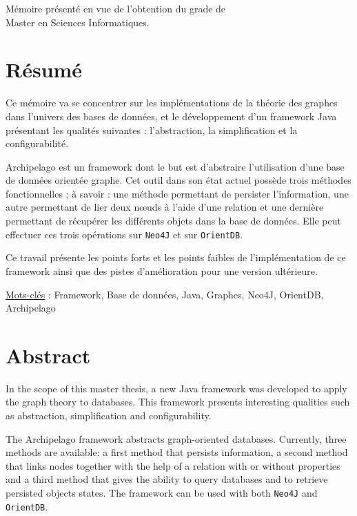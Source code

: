\documentclass[a4paper,fleqn,12pt,oneside]{book}
\begin{document}
\vspace{0.5cm}
\begin{center}
M\'emoire pr\'esent\'e en vue de l'obtention du grade de\\
Master en Sciences Informatiques.
\end{center}
\frontmatter
{}
\section*{Résumé}

Ce mémoire va se concentrer sur les implémentations de la théorie des graphes dans l'univers des bases de données, et le développement d'un framework Java présentant les qualités suivantes : l'abstraction, la simplification et la configurabilité. 

Archipelago est un framework dont le but est d'abstraire l'utilisation d'une base de données orientée graphe. Cet outil dans son  état actuel possède trois méthodes fonctionnelles ; à savoir : une méthode permettant de persister l'information, une autre permettant de lier deux nœuds à l'aide d'une relation et une dernière permettant de récupérer les différents objets dans la base de données. Elle peut effectuer ces trois opérations sur \texttt{Neo4J} et sur \texttt{OrientDB}.

Ce travail présente les points forts et les points faibles de l'implémentation de ce framework ainsi que des pistes d'amélioration pour une version ultérieure.

\quad \quad \underline{Mots-clés} : Framework, Base de données, Java, Graphes, Neo4J, OrientDB, Archipelago
\section*{Abstract}

In the scope of this master thesis, a new Java framework was developed to apply the graph theory to databases. This framework presents interesting qualities such as abstraction, simplification and configurability. 

The Archipelago framework abstracts graph-oriented databases. Currently, three methods are available: a first method that persists information, a second method that links nodes together with the help of a relation with or without properties and a third method that gives the ability to query databases and to retrieve persisted objects states. The framework can be used with both \texttt{Neo4J} and \texttt{OrientDB}.
\end{document}
